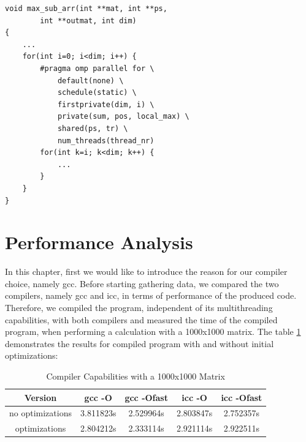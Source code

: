 \documentclass[conference]{IEEEtran}
\begin{document}
\begin{center}
   \begin{lstlisting}[captionpos=b, caption=OpenMP: Parallel Main Algorithm - Second Approach, label=lst:alg2]  
void max_sub_arr(int **mat, int **ps,                                                  
        int **outmat, int dim)                                                   
{                                                              
    ...                                        
    for(int i=0; i<dim; i++) {                                 
        #pragma omp parallel for \                             
            default(none) \                                    
            schedule(static) \                                 
            firstprivate(dim, i) \                             
            private(sum, pos, local_max) \                     
            shared(ps, tr) \                                   
            num_threads(thread_nr)                                                                                          
        for(int k=i; k<dim; k++) { 
            ...
        }
    }
}
   \end{lstlisting}
\end{center}



\section{Performance Analysis}
\label{sec:analysis}
In this chapter, first we would like to introduce the reason for our compiler choice, namely gcc. Before starting gathering data, we compared the two compilers, namely gcc and icc, in terms of performance of the produced code. Therefore, we compiled the program, independent of its multithreading capabilities, with both compilers and measured the time of the compiled program, when performing a calculation with a 1000x1000 matrix. The table \ref{table:compiler} demonstrates the results for compiled program with and without initial optimizations: 

\begin{table}[!t]
\renewcommand{\arraystretch}{1.3}
\caption{Compiler Capabilities with a 1000x1000 Matrix}
\label{table:compiler}
\centering
\begin{tabular}{|c||c|c|c|c|}
\hline
Version & gcc -O & gcc -Ofast & icc -O & icc -Ofast \\
\hline
no optimizations & 3.811823s & 2.529964s & 2.803847s & 2.752357s \\
\hline
optimizations & 2.804212s & 2.333114s & 2.921114s & 2.922511s \\
\hline
\end{tabular}
\end{table}
\end{document}
